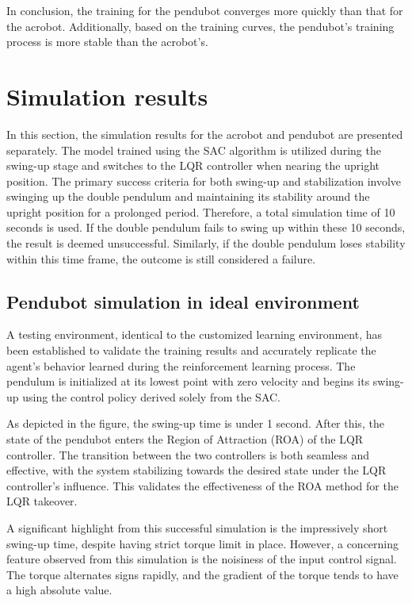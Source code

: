 In conclusion, the training for the pendubot converges more quickly than that for the acrobot. Additionally, based on the training curves, the pendubot's training process is more stable than the acrobot's.

\section{Simulation results}
In this section, the simulation results for the acrobot and pendubot are presented separately. The model trained using the SAC algorithm is utilized during the swing-up stage and switches to the LQR controller when nearing the upright position. The primary success criteria for both swing-up and stabilization involve swinging up the double pendulum and maintaining its stability around the upright position for a prolonged period. Therefore, a total simulation time of 10 seconds is used. If the double pendulum fails to swing up within these 10 seconds, the result is deemed unsuccessful. Similarly, if the double pendulum loses stability within this time frame, the outcome is still considered a failure.

\subsection{Pendubot simulation in ideal environment}
A testing environment, identical to the customized learning environment, has been established to validate the training results and accurately replicate the agent's behavior learned during the reinforcement learning process. The pendulum is initialized at its lowest point with zero velocity and begins its swing-up using the control policy derived solely from the SAC.

As depicted in the figure, the swing-up time is under 1 second. After this, the state of the pendubot enters the Region of Attraction (ROA) of the LQR controller. The transition between the two controllers is both seamless and effective, with the system stabilizing towards the desired state under the LQR controller's influence. This validates the effectiveness of the ROA method for the LQR takeover.

A significant highlight from this successful simulation is the impressively short swing-up time, despite having strict torque limit in place. However, a concerning feature observed from this simulation is the noisiness of the input control signal. The torque alternates signs rapidly, and the gradient of the torque tends to have a high absolute value.

